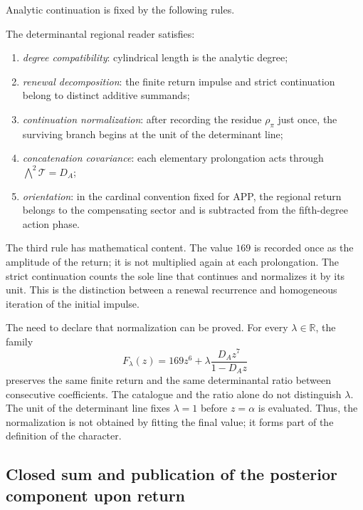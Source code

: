 Analytic continuation is fixed by the following rules.

\begin{definition}
\label{p3-20260826:def:lector-regional-determinantal}
The determinantal regional reader satisfies:
\begin{enumerate}
  \item \emph{degree compatibility}: cylindrical length is the analytic
  degree;
  \item \emph{renewal decomposition}: the finite return impulse and
  strict continuation belong to distinct additive summands;
  \item \emph{continuation normalization}: after recording the residue
  \(\rho_\pi\) just once, the surviving branch begins at the unit of
  the determinant line;
  \item \emph{concatenation covariance}: each elementary prolongation
  acts through \(\bigwedge^2\mathcal T=D_A\);
  \item \emph{orientation}: in the cardinal convention fixed for APP, the
  regional return belongs to the compensating sector and is subtracted from the fifth-degree
action phase.
\end{enumerate}
\end{definition}

The third rule has mathematical content. The value \(169\) is recorded once as the amplitude of the return; it is not multiplied again at each prolongation. The strict continuation counts the sole line that continues and normalizes it by its unit. This is the distinction between a renewal recurrence and homogeneous iteration of the initial impulse.

The need to declare that normalization can be proved. For every
\(\lambda\in\mathbb R\), the family
\[
F_\lambda(z)
=169z^6+\lambda\frac{D_Az^7}{1-D_Az}
\]
preserves the same finite return and the same determinantal ratio between
consecutive coefficients. The catalogue and the ratio alone do not distinguish
\(\lambda\). The unit of the determinant line fixes
\(\lambda=1\) before \(z=\alpha\) is evaluated. Thus, the normalization
is not obtained by fitting the final value; it forms part of the definition of the
character.

\subsection{Closed sum and publication of the posterior component upon return}
\label{sec:s102:c38:2:7}

